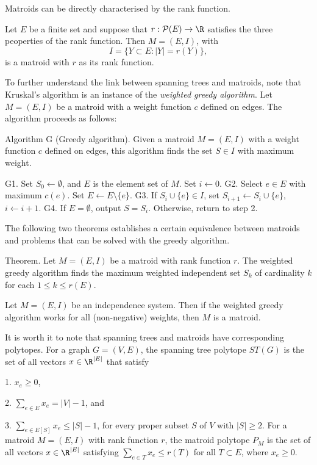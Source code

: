 Matroids can be directly characterised by the rank function.

 Let $E$ be a finite set and suppose that $r : {\cal P}(E)\rightarrow \R$ satisfies the three peoperties of the rank function. Then $M=(E,I)$, with
$$I = \{Y \subset E : |Y| = r(Y)\},$$
is a matroid with $r$ as its rank function.

To further understand the link between spanning trees and matroids, note that Kruskal's algorithm is an instance of the {\it weighted greedy algorithm}. Let $M=(E,I)$ be a matroid with a weight function $c$ defined on edges. The algorithm proceeds as follows:

\algbegin Algorithm G (Greedy algorithm). Given a matroid $M=(E,I)$ with a weight function $c$ defined on edges, this algorithm finds the set $S\in I$ with maximum weight.

\algstep G1. Set $S_0\gets\emptyset$, and $E$ is the element set of $M$. Set $i\gets 0$.
\algstep G2. Select $e\in E$ with maximum $c(e)$. Set $E\gets E\setminus\{e\}$.
\algstep G3. If $S_i\cup\{e\}\in I$, set $S_{i+1}\gets S_i\cup\{e\}$, $i\gets i + 1$.
\algstep G4. If $E = \emptyset$, output $S = S_i$. Otherwise, return to step 2.\slug

The following two theorems establishes a certain equivalence between matroids and problems that can be solved with the greedy algorithm.

\proclaim Theorem. Let $M=(E,I)$ be a matroid with rank function $r$. The weighted greedy algorithm finds the maximum weighted independent set $S_k$ of cardinality $k$ for each $1\leq k\leq r(E)$.\slug

 Let $M=(E,I)$ be an independence system. Then if the weighted greedy algorithm works for all (non-negative) weights, then $M$ is a matroid.\slug

It is worth it to note that spanning trees and matroids have corresponding polytopes. For a graph $G=(V,E)$, the spanning tree polytope $ST(G)$ is the set of all vectors $x\in \R^{|E|}$ that satisfy
\medskip
\item {1.} $x_e \geq 0$,
\smallskip
\item {2.} $\displaystyle\sum_{e\in E} x_e = |V| - 1$, and
\smallskip
\item {3.} $\displaystyle\sum_{e\in E[S]} x_e \leq |S| - 1$, for every proper subset $S$ of $V$ with $|S| \geq 2$.
\medskip
For a matroid $M=(E,I)$ with rank function $r$, the matroid polytope $P_M$ is the set of all vectors $x\in \R^{|E|}$ satisfying $\sum_{e\in T} x_e \leq r(T)$ for all $T\subset E$, where $x_e\geq 0$.

